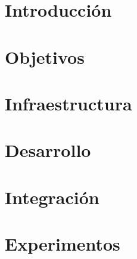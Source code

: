 \documentclass[a4paper, 12pt]{book}
\begin{document}
\cleardoublepage


\cleardoublepage
\pagestyle{plain}
\chapter{Introducción}


\cleardoublepage
\chapter{Objetivos}


\cleardoublepage
\chapter{Infraestructura}


\cleardoublepage
\chapter{Desarrollo}


\cleardoublepage
\chapter{Integración}


\cleardoublepage
\chapter{Experimentos}

\end{document}
